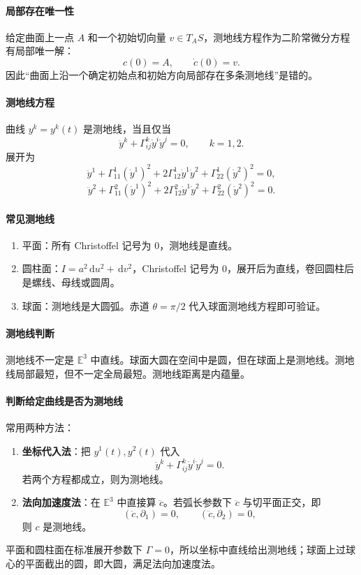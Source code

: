 \documentclass[UTF8,12pt,a4paper]{ctexart}
\newcommand{\E}{\mathbb E}
\newcommand{\dd}{\,\mathrm d}
\begin{document}
\paragraph{局部存在唯一性}
给定曲面上一点 $A$ 和一个初始切向量 $v\in T_AS$，测地线方程作为二阶常微分方程有局部唯一解：
\[
c(0)=A,\qquad \dot c(0)=v.
\]
因此“曲面上沿一个确定初始点和初始方向局部存在多条测地线”是错的。

\paragraph{测地线方程}
曲线 $y^k=y^k(t)$ 是测地线，当且仅当
\[
\ddot y^k+\Gamma^k_{ij}\dot y^i\dot y^j=0,\qquad k=1,2.
\]
展开为
\[
\ddot y^1+\Gamma^1_{11}(\dot y^1)^2
+2\Gamma^1_{12}\dot y^1\dot y^2
+\Gamma^1_{22}(\dot y^2)^2=0,
\]
\[
\ddot y^2+\Gamma^2_{11}(\dot y^1)^2
+2\Gamma^2_{12}\dot y^1\dot y^2
+\Gamma^2_{22}(\dot y^2)^2=0.
\]

\paragraph{常见测地线}
\begin{enumerate}
\item 平面：所有 Christoffel 记号为 $0$，测地线是直线。
\item 圆柱面：$I=a^2\dd u^2+\dd v^2$，Christoffel 记号为 $0$，展开后为直线，卷回圆柱后是螺线、母线或圆周。
\item 球面：测地线是大圆弧。赤道 $\theta=\pi/2$ 代入球面测地线方程即可验证。
\end{enumerate}

\paragraph{测地线判断}
测地线不一定是 $\E^3$ 中直线。球面大圆在空间中是圆，但在球面上是测地线。测地线局部最短，但不一定全局最短。测地线距离是内蕴量。

\paragraph{判断给定曲线是否为测地线}
常用两种方法：
\begin{enumerate}
\item \textbf{坐标代入法}：把 $y^1(t),y^2(t)$ 代入
\[
\ddot y^k+\Gamma^k_{ij}\dot y^i\dot y^j=0.
\]
若两个方程都成立，则为测地线。
\item \textbf{法向加速度法}：在 $\E^3$ 中直接算 $\ddot c$。若弧长参数下 $\ddot c$ 与切平面正交，即
\[
(\ddot c,\partial_1)=0,\qquad (\ddot c,\partial_2)=0,
\]
则 $c$ 是测地线。
\end{enumerate}
平面和圆柱面在标准展开参数下 $\Gamma=0$，所以坐标中直线给出测地线；球面上过球心的平面截出的圆，即大圆，满足法向加速度法。
\end{document}
